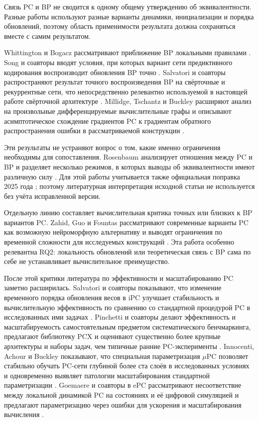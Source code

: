 Связь PC и BP не сводится к одному общему утверждению об эквивалентности.
Разные работы используют разные варианты динамики, инициализации и порядка
обновлений, поэтому область применимости результата должна сохраняться вместе
с самим результатом.

Whittington и Bogacz рассматривают приближение BP локальными правилами
\cite{whittington2017approximation}. Song и соавторы вводят условия, при которых
вариант сети предиктивного кодирования воспроизводит обновления BP точно
\cite{song2020exact}. Salvatori и соавторы распространяют результат точного воспроизведения BP на
свёрточные и рекуррентные сети, что непосредственно релевантно используемой в
настоящей работе свёрточной архитектуре \cite{salvatori2021convolutional}.
Millidge, Tschantz и Buckley расширяют анализ на произвольные дифференцируемые
вычислительные графы и описывают асимптотическое схождение градиентов PC к
градиентам обратного распространения ошибки в рассматриваемой конструкции
\cite{millidge2022arbitrary}.

Эти результаты не устраняют вопрос о том, какие именно ограничения необходимы
для сопоставления. Rosenbaum анализирует отношения между PC и BP и разделяет
несколько режимов, в которых выводы об эквивалентности имеют различную силу
\cite{rosenbaum2022relationship}. Для этой работы учитывается также официальная
поправка 2025 года \cite{rosenbaum2025correction}; поэтому литературная
интерпретация исходной статьи не используется без учёта исправленной версии.

Отдельную линию составляет вычислительная критика точных или близких к BP
вариантов PC. Zahid, Guo и Fountas рассматривают современные варианты PC как
возможную нейроморфную альтернативу и выводят ограничения по временной
сложности для исследуемых конструкций \cite{zahid2023critical}. Эта работа
особенно релевантна RQ2: локальность обновлений или теоретическая связь с BP
сама по себе не устанавливает вычислительное преимущество.

После этой критики литература по эффективности и масштабированию PC заметно
расширилась. Salvatori и соавторы показывают, что изменение временного порядка
обновления весов в iPC улучшает стабильность и вычислительную
эффективность по сравнению со стандартной процедурой PC в исследованных ими
задачах \cite{salvatori2024stable}. Pinchetti и соавторы делают эффективность и
масштабируемость самостоятельным предметом систематического бенчмаркинга,
предлагают библиотеку PCX и оценивают существенно более крупные архитектуры и
наборы задач, чем типичные ранние PC-эксперименты \cite{pinchetti2025benchmarking}.
Innocenti, Achour и Buckley показывают, что специальная параметризация
$\mu$PC позволяет стабильно обучать PC-сети глубиной более ста слоёв в
исследованных условиях и одновременно выявляет патологии масштабирования
стандартной параметризации \cite{innocenti2025mupc}. Goemaere и соавторы в ePC
рассматривают несоответствие между локальной динамикой PC на состояниях и её
цифровой симуляцией и предлагают параметризацию через ошибки для ускорения и
масштабирования вычисления \cite{goemaere2026epc}.

